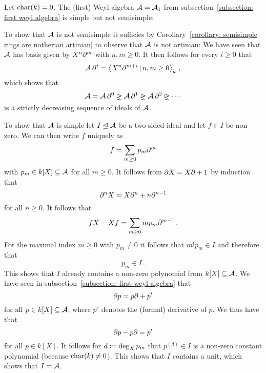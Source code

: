 \begin{example}
  \label{example: simple but not semisimple}
  Let $\operatorname{char}(k) = 0$.
  The (first) Weyl algebra $\operatorname{\mathcal{A}} = \operatorname{\mathcal{A}}_1$ from subsection~\ref{subsection: first weyl algebra} is simple but not semisimple:
  
  To show that $\operatorname{\mathcal{A}}$ is not semisimple it sufficies by Corollary~\ref{corollary: semisimple rings are notherian artinian} to observe that $\operatorname{\mathcal{A}}$ is not artinian:
  We have seen that $\operatorname{\mathcal{A}}$ has basis given by $X^n \partial^m$ with $n, m \geq 0$.
  It then follows for every $i \geq 0$ that
  \[
      \weyl \del^i
    = \gen{ X^n \del^{m+i} \suchthat n, m \geq 0 }_k \,,
  \]
  which shows that
  \[
                \weyl
    =           \weyl \del^0
    \idealgneq  \weyl \del^1
    \idealgneq  \weyl \del^2
    \idealgneq  \dotsb
  \]
  is a strictly decreasing sequence of ideals of $\operatorname{\mathcal{A}}$.
  
  To show that $\operatorname{\mathcal{A}}$ is simple let $I \trianglelefteq \operatorname{\mathcal{A}}$ be a two-sided ideal and let $f \in I$ be non-zero.
  We can then write $f$ uniquely as
  \[
      f
    = \sum_{m \geq 0} p_m \partial^m
  \]
  with $p_m \in k[X] \subseteq \operatorname{\mathcal{A}}$ for all $m \geq 0$.
  It follows from $\partial X = X \partial + 1$ by induction that 
  \[
      \partial^n X
    = X \partial^n + n \partial^{n-1}
  \]
  for all $n \geq 0$.
  It follows that
  \[
      f X - X f
    = \sum_{m \geq 0} m p_m \partial^{m-1} \,.
  \]
  For the maximal index $m \geq 0$ with $p_m \neq 0$ it follows that $m! p_m \in I$ and therefore that
  \[
    p_m \in I \,.
  \]
  This shows that $I$ already contains a non-zero polynomial from $k[X] \subseteq \operatorname{\mathcal{A}}$.
  We have seen in subsection~\ref{subsection: first weyl algebra} that
  \[
    \partial p = p \partial + p'
  \]
  for all $p \in k[X] \subseteq \operatorname{\mathcal{A}}$, where $p'$ denotes the (formal) derivative of $p$.
  We thus have that
  \[
      \partial p - p \partial
    = p'
  \]
  for all $p \in k[X]$.
  It follows for $d \coloneqq \deg_X p_m$ that $p^{(d)} \in I$ is a non-zero constant polynomial (because $\operatorname{char}(k) \neq 0$).
  This shows that $I$ contains a unit, which shows that $I = \operatorname{\mathcal{A}}$.
\end{example}


